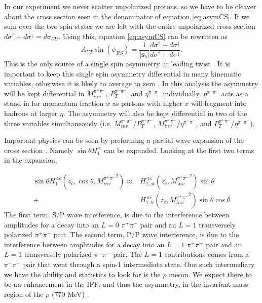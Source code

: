 \documentclass[abstract = on,listof=totoc, bibliography=totoc]{scrreprt}
\newcommand{\phirs}{\phi_{RS}}
\newcommand{\ptpair}{P_{T}^{\pi^+\pi^-}}
\newcommand{\mpair}{M_{inv}^{\pi^+\pi^-}}
\newcommand{\etapair}{\eta^{\pi^+\pi^-}}
\newcommand{\pip}{\pi^+}
\newcommand{\pim}{\pi^-}
\newcommand{\pair}{$\pip\pim$ }
\begin{document}
In our experiment we never scatter unpolarized protons, so we have to be cleaver about the cross section seen in the denominator of equation \ref{eq:asymCS}. If we sum over the two spin states we are left with the entire unpolarized cross section $d\sigma^\uparrow + d\sigma^\downarrow = d\sigma_{UU}$. Using this, equation \ref{eq:asymCS} can be rewritten as \cite{bacchettaRadici2, BacchettaThesis, PhysRevLett.80.1166} 
\begin{equation}
\label{eq:SSA}
A_{UT} \sin (\phirs) =\frac{1}{|\bm{s}_b|} \frac{d\sigma^\uparrow - d\sigma^\downarrow}{d\sigma^\uparrow + d\sigma^\downarrow}.
\end{equation}
This is the only source of a single spin asymmetry at leading twist \cite{bacchettaRadici2}. It is important to keep this single spin asymmetry differential in many kinematic variables, otherwise it is likely to average to zero \cite{keepDifferential}. In this analysis the asymmetry will be kept differential in $\mpair$, $\ptpair$, and $\etapair$ individually. $\etapair$ acts as a stand in for momentum fraction $x$ as partons with higher $x$ will fragment into hadrons at larger $\eta$. The asymmetry will also be kept differential in two of the three variables simultaneously (i.e. $\mpair$/$\ptpair$, $\mpair$/$\etapair$, and $\ptpair$/$\etapair$). 

Important physics can be seen by preforming a partial wave expansion of the cross section \cite{partialWave}. Namely $\sin \theta H_1^\sphericalangle$ can be expanded. Looking at the first two terms in the expansion, 


\begin{align}
\label{eq:partialwaveexpansion}
\sin \theta H_1^{\sphericalangle c} (\bar{z_c},\cos \theta, {\mpair}^2) \approx &H^{\sphericalangle c}_{1,ot}(\bar{z_c},{\mpair}^2) \sin\theta \nonumber \\
+ &H^{\sphericalangle c}_{1,lt}(\bar{z_c},{\mpair}^2) \sin\theta \cos\theta
\end{align}
%
The first term, S/P wave interference, is due to the interference between amplitudes for a decay into an $L = 0$  \pair pair and an $L = 1$ transversely polarized \pair pair. The second term, P/P wave interference, is due to the interference between amplitudes for a decay into an $L = 1$ \pair pair and an $L = 1$ transversely polarized \pair pair. The $L=1$ contributions comes from a \pair pair that went through a spin-1 intermediate state. One such intermediary we have the ability and statistics to look for is the $\rho$ meson. We expect there to be an enhancement in the IFF, and thus the asymmetry, in the invariant mass region of the $\rho$ (770 MeV) \cite{bacchettaRadici2, Tang}.    
\end{document}

